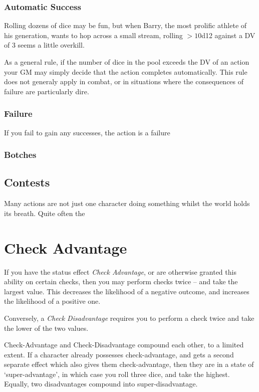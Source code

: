 \subsubsection{Automatic Success}

Rolling dozens of dice may be fun, but when Barry, the most prolific athlete of his generation, wants to hop across a small stream, rolling $>10$d12 against a DV of 3 seems a little overkill. 

As a general rule, if the number of dice in the pool exceeds the DV of an action your GM may simply decide that the action completes automatically. This rule does not generaly apply in combat, or in situations where the consequences of failure are particularly dire. 

\subsubsection{Failure}

If you fail to gain any successes, the action is a failure

\subsubsection{Botches}

\subsection{Contests}

Many actions are not just one character doing something whilst the world holds its breath. Quite often the 

\section{Check Advantage}

If you have the status effect {\it Check Advantage}, or are otherwise granted this ability on certain checks, then you may perform checks twice -- and take the largest value. This decreases the likelihood of a negative outcome, and increases the likelihood of a positive one. 

Conversely, a {\it Check Disadvantage} requires you to perform a check twice and take the lower of the two values. 

Check-Advantage and Check-Disadvantage compound each other, to a limited extent. If a character already possesses check-advantage, and gets a second separate effect which also gives them check-advantage, then they are in a state of `super-advantage', in which case you roll three dice, and take the highest. Equally, two disadvantages compound into super-disadvantage. 

